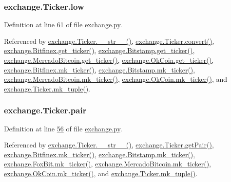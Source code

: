\subsubsection[{\texorpdfstring{low}{low}}]{\setlength{\rightskip}{0pt plus 5cm}exchange.\+Ticker.\+low}\hypertarget{classexchange_1_1_ticker_a1c1f26a47a82fc799fcebf158e104405}{}\label{classexchange_1_1_ticker_a1c1f26a47a82fc799fcebf158e104405}


Definition at line \hyperlink{exchange_8py_source_l00061}{61} of file \hyperlink{exchange_8py_source}{exchange.\+py}.



Referenced by \hyperlink{exchange_8py_source_l00111}{exchange.\+Ticker.\+\_\+\+\_\+str\+\_\+\+\_\+()}, \hyperlink{exchange_8py_source_l00065}{exchange.\+Ticker.\+convert()}, \hyperlink{exchange_8py_source_l00332}{exchange.\+Bitfinex.\+get\+\_\+ticker()}, \hyperlink{exchange_8py_source_l00401}{exchange.\+Bitstamp.\+get\+\_\+ticker()}, \hyperlink{exchange_8py_source_l00535}{exchange.\+Mercado\+Bitcoin.\+get\+\_\+ticker()}, \hyperlink{exchange_8py_source_l00600}{exchange.\+Ok\+Coin.\+get\+\_\+ticker()}, \hyperlink{exchange_8py_source_l00346}{exchange.\+Bitfinex.\+mk\+\_\+ticker()}, \hyperlink{exchange_8py_source_l00415}{exchange.\+Bitstamp.\+mk\+\_\+ticker()}, \hyperlink{exchange_8py_source_l00549}{exchange.\+Mercado\+Bitcoin.\+mk\+\_\+ticker()}, \hyperlink{exchange_8py_source_l00614}{exchange.\+Ok\+Coin.\+mk\+\_\+ticker()}, and \hyperlink{exchange_8py_source_l00096}{exchange.\+Ticker.\+mk\+\_\+tuple()}.

\subsubsection[{\texorpdfstring{pair}{pair}}]{\setlength{\rightskip}{0pt plus 5cm}exchange.\+Ticker.\+pair}\hypertarget{classexchange_1_1_ticker_a382f9199d13a7b5929a26065fad4e491}{}\label{classexchange_1_1_ticker_a382f9199d13a7b5929a26065fad4e491}


Definition at line \hyperlink{exchange_8py_source_l00056}{56} of file \hyperlink{exchange_8py_source}{exchange.\+py}.



Referenced by \hyperlink{exchange_8py_source_l00111}{exchange.\+Ticker.\+\_\+\+\_\+str\+\_\+\+\_\+()}, \hyperlink{exchange_8py_source_l00090}{exchange.\+Ticker.\+get\+Pair()}, \hyperlink{exchange_8py_source_l00346}{exchange.\+Bitfinex.\+mk\+\_\+ticker()}, \hyperlink{exchange_8py_source_l00415}{exchange.\+Bitstamp.\+mk\+\_\+ticker()}, \hyperlink{exchange_8py_source_l00474}{exchange.\+Fox\+Bit.\+mk\+\_\+ticker()}, \hyperlink{exchange_8py_source_l00549}{exchange.\+Mercado\+Bitcoin.\+mk\+\_\+ticker()}, \hyperlink{exchange_8py_source_l00614}{exchange.\+Ok\+Coin.\+mk\+\_\+ticker()}, and \hyperlink{exchange_8py_source_l00096}{exchange.\+Ticker.\+mk\+\_\+tuple()}.

